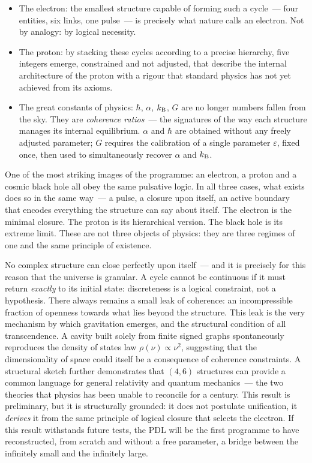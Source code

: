 \documentclass[12pt, a4paper, openright]{book}
\begin{document}
\begin{itemize}
\item The electron: the smallest structure capable of forming such a cycle~--- four entities, six links, one pulse~--- is precisely what nature calls an electron. Not by analogy: by logical necessity.
\item The proton: by stacking these cycles according to a precise hierarchy, five integers emerge, constrained and not adjusted, that describe the internal architecture of the proton with a rigour that standard physics has not yet achieved from its axioms.
\item The great constants of physics: $\hbar$, $\alpha$, $k_{\rm B}$, $G$ are no longer numbers fallen from the sky. They are \emph{coherence ratios}~--- the signatures of the way each structure manages its internal equilibrium. $\alpha$ and $\hbar$ are obtained without any freely adjusted parameter; $G$ requires the calibration of a single parameter $\varepsilon$, fixed once, then used to simultaneously recover $\alpha$ and $k_{\rm B}$.
\end{itemize}

One of the most striking images of the programme: an electron, a proton and a cosmic black hole all obey the same pulsative logic. In all three cases, what exists does so in the same way~--- a pulse, a closure upon itself, an active boundary that encodes everything the structure can say about itself. The electron is the minimal closure. The proton is its hierarchical version. The black hole is its extreme limit. These are not three objects of physics: they are three regimes of one and the same principle of existence.

\medskip

No complex structure can close perfectly upon itself~--- and it is precisely for this reason that the universe is granular. A cycle cannot be continuous if it must return \emph{exactly} to its initial state: discreteness is a logical constraint, not a hypothesis. There always remains a small leak of coherence: an incompressible fraction of openness towards what lies beyond the structure. This leak is the very mechanism by which gravitation emerges, and the structural condition of all transcendence. A cavity built solely from finite signed graphs spontaneously reproduces the density of states law $\rho(\nu)\propto\nu^{2}$, suggesting that the dimensionality of space could itself be a consequence of coherence constraints. A structural sketch further demonstrates that $(4,6)$ structures can provide a common language for general relativity and quantum mechanics~--- the two theories that physics has been unable to reconcile for a century. This result is preliminary, but it is structurally grounded: it does not postulate unification, it \emph{derives} it from the same principle of logical closure that selects the electron. If this result withstands future tests, the PDL will be the first programme to have reconstructed, from scratch and without a free parameter, a bridge between the infinitely small and the infinitely large.
\end{document}
